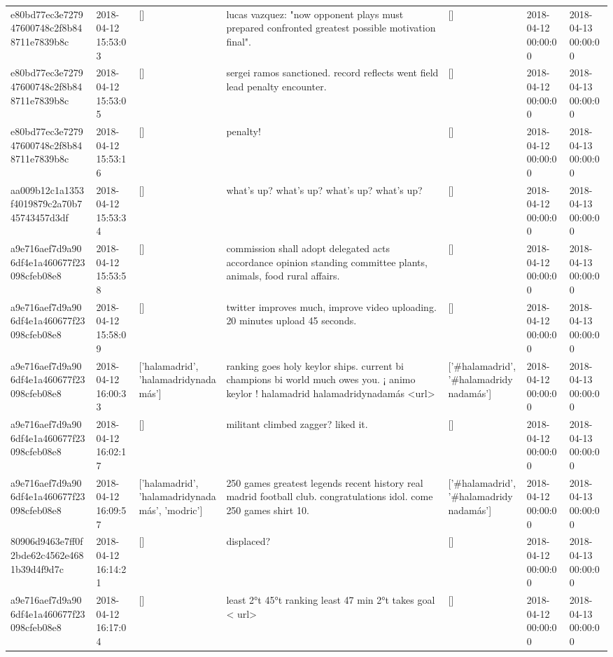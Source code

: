 \begin{tabular}{lllllll}
e80bd77ec3e727947600748c2f8b848711e7839b8c & 2018-04-12 15:53:03 & [] & lucas vazquez: "now opponent plays must prepared confronted greatest possible motivation final". & [] & 2018-04-12 00:00:00 & 2018-04-13 00:00:00 \\
e80bd77ec3e727947600748c2f8b848711e7839b8c & 2018-04-12 15:53:05 & [] & sergei ramos sanctioned. record reflects went field lead penalty encounter. & [] & 2018-04-12 00:00:00 & 2018-04-13 00:00:00 \\
e80bd77ec3e727947600748c2f8b848711e7839b8c & 2018-04-12 15:53:16 & [] & penalty! & [] & 2018-04-12 00:00:00 & 2018-04-13 00:00:00 \\
aa009b12c1a1353f4019879c2a70b745743457d3df & 2018-04-12 15:53:34 & [] & what's up? what's up? what's up? what's up? & [] & 2018-04-12 00:00:00 & 2018-04-13 00:00:00 \\
a9e716aef7d9a906df4e1a460677f23098cfeb08e8 & 2018-04-12 15:53:58 & [] & commission shall adopt delegated acts accordance opinion standing committee plants, animals, food rural affairs. & [] & 2018-04-12 00:00:00 & 2018-04-13 00:00:00 \\
a9e716aef7d9a906df4e1a460677f23098cfeb08e8 & 2018-04-12 15:58:09 & [] & twitter improves much, improve video uploading. 20 minutes upload 45 seconds. & [] & 2018-04-12 00:00:00 & 2018-04-13 00:00:00 \\
a9e716aef7d9a906df4e1a460677f23098cfeb08e8 & 2018-04-12 16:00:33 & ['halamadrid', 'halamadridynadamás'] & ranking goes holy keylor ships. current bi champions bi world much owes you. ¡ animo keylor ! halamadrid halamadridynadamás <url> & ['#halamadrid', '#halamadridynadamás'] & 2018-04-12 00:00:00 & 2018-04-13 00:00:00 \\
a9e716aef7d9a906df4e1a460677f23098cfeb08e8 & 2018-04-12 16:02:17 & [] & militant climbed zagger? liked it. & [] & 2018-04-12 00:00:00 & 2018-04-13 00:00:00 \\
a9e716aef7d9a906df4e1a460677f23098cfeb08e8 & 2018-04-12 16:09:57 & ['halamadrid', 'halamadridynadamás', 'modric'] & 250 games greatest legends recent history real madrid football club. congratulations idol. come 250 games shirt 10. & ['#halamadrid', '#halamadridynadamás'] & 2018-04-12 00:00:00 & 2018-04-13 00:00:00 \\
80906d9463e7ff0f2bde62c4562e4681b39d4f9d7c & 2018-04-12 16:14:21 & [] & displaced? & [] & 2018-04-12 00:00:00 & 2018-04-13 00:00:00 \\
a9e716aef7d9a906df4e1a460677f23098cfeb08e8 & 2018-04-12 16:17:04 & [] & least 2°t 45°t ranking least 47 min 2°t takes goal < url> & [] & 2018-04-12 00:00:00 & 2018-04-13 00:00:00 \\

\end{tabular}
